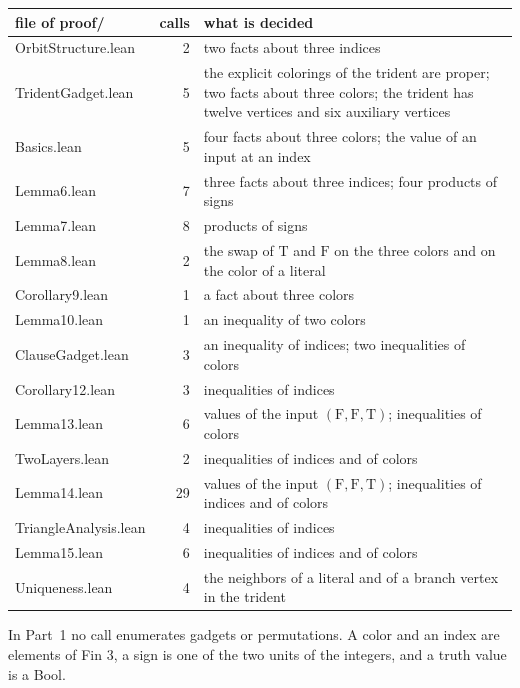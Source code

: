 \documentclass[11pt,a4paper]{article}
\newcommand{\leanus}{\textunderscore\allowbreak}
\newcommand{\lean}[1]{{\ttfamily\let\_\leanus #1}}
\newcommand{\T}{\mathrm{T}}
\newcommand{\F}{\mathrm{F}}
\begin{document}
\begin{center}
\begin{tabular}{@{}lrp{}@{}}
\toprule
file of \lean{proof/} & calls & what is decided\\
\midrule
\lean{OrbitStructure.lean} & 2 & two facts about three indices\\
\lean{TridentGadget.lean} & 5 & the explicit colorings of the trident are proper; two facts about three colors; the trident has twelve vertices and six auxiliary vertices\\
\lean{Basics.lean} & 5 & four facts about three colors; the value of an input at an index\\
\lean{Lemma6.lean} & 7 & three facts about three indices; four products of signs\\
\lean{Lemma7.lean} & 8 & products of signs\\
\lean{Lemma8.lean} & 2 & the swap of $\T$ and $\F$ on the three colors and on the color of a literal\\
\lean{Corollary9.lean} & 1 & a fact about three colors\\
\lean{Lemma10.lean} & 1 & an inequality of two colors\\
\lean{ClauseGadget.lean} & 3 & an inequality of indices; two inequalities of colors\\
\lean{Corollary12.lean} & 3 & inequalities of indices\\
\lean{Lemma13.lean} & 6 & values of the input $(\F,\F,\T)$; inequalities of colors\\
\lean{TwoLayers.lean} & 2 & inequalities of indices and of colors\\
\lean{Lemma14.lean} & 29 & values of the input $(\F,\F,\T)$; inequalities of indices and of colors\\
\lean{TriangleAnalysis.lean} & 4 & inequalities of indices\\
\lean{Lemma15.lean} & 6 & inequalities of indices and of colors\\
\lean{Uniqueness.lean} & 4 & the neighbors of a literal and of a branch vertex in the trident\\
\bottomrule
\end{tabular}
\end{center}
In Part~1 no call enumerates gadgets or permutations. A color and an index
are elements of \lean{Fin 3}, a sign is one of the two units of the integers,
and a truth value is a \lean{Bool}.
\end{document}
